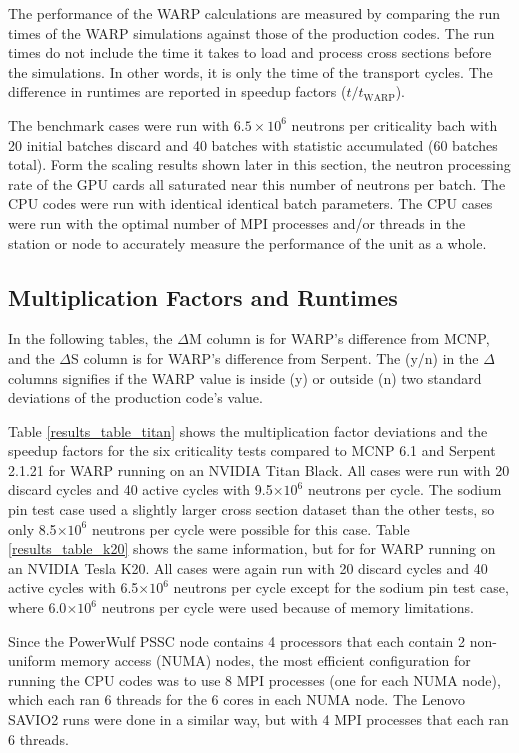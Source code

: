 \documentclass[preprint,12pt]{elsarticle}
\begin{document}
The performance of the WARP calculations are measured by comparing the run times of the WARP simulations against those of the production codes.  The run times do not include the time it takes to load and process cross sections before the simulations.  In other words, it is only the time of the transport cycles.  The difference in runtimes are reported in speedup factors ($t/t_\mathrm{WARP}$). 

The benchmark cases were run with $6.5\times10^6$ neutrons per criticality bach with 20 initial batches discard and 40 batches with statistic accumulated (60 batches total).  Form the scaling results shown later in this section, the neutron processing rate of the GPU cards all saturated near this number of neutrons per batch.  The CPU codes were run with identical identical batch parameters.  The CPU cases were run with the optimal number of MPI processes and/or threads in the station or node to accurately measure the performance of the unit as a whole. 

\subsection{Multiplication Factors and Runtimes}

In the following tables, the $\Delta$M column is for WARP's difference from MCNP, and the $\Delta$S column is for WARP's difference from Serpent.  The (y/n) in the $\Delta$ columns signifies if the WARP value is inside (y) or outside (n) two standard deviations of the production code's value. 

Table \ref{results_table_titan} shows the multiplication factor deviations and the speedup factors for the six criticality tests compared to MCNP 6.1 and Serpent 2.1.21 for WARP running on an NVIDIA Titan Black.   All cases were run with 20 discard cycles and 40 active cycles with 9.5$\times10^{6}$ neutrons per cycle.  The sodium pin test case used a slightly larger cross section dataset than the other tests, so only 8.5$\times10^{6}$ neutrons per cycle were possible for this case.  Table  \ref{results_table_k20} shows the same information, but for for WARP running on an NVIDIA Tesla K20.  All cases were again run with 20 discard cycles and 40 active cycles with 6.5$\times10^{6}$ neutrons per cycle except for the sodium pin test case, where 6.0$\times10^{6}$ neutrons per cycle were used because of memory limitations.

Since the PowerWulf PSSC node contains 4 processors that each contain 2 non-uniform memory access (NUMA) nodes, the most efficient configuration for running the CPU codes was to use 8 MPI processes (one for each NUMA node), which each ran 6 threads for the 6 cores in each NUMA node.  The Lenovo SAVIO2 runs were done in a similar way, but with 4 MPI processes that each ran 6 threads.
\end{document}
